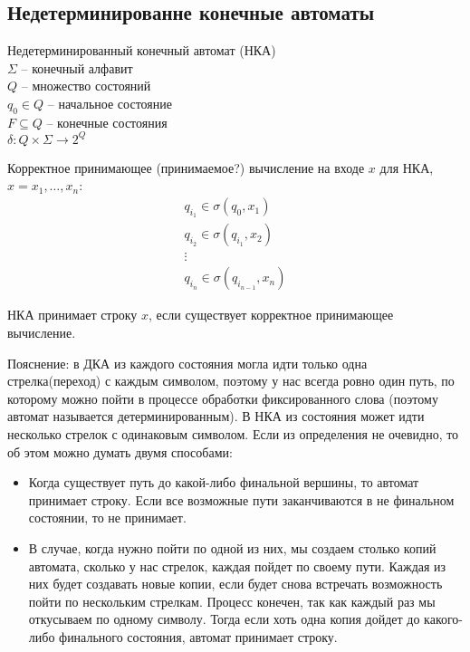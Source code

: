 \subsection{Недетерминированне конечные автоматы}

\begin{conj}
    Недетерминированный конечный автомат (НКА)\\
    $\Sigma$ -- конечный алфавит\\
    $Q$ -- множество состояний\\
    $q_0 \in Q$ -- начальное состояние\\
    $F \subseteq Q$ -- конечные состояния\\
    $\delta: Q \times \Sigma \to 2^Q$
\end{conj}
\begin{conj}
    Корректное принимающее (принимаемое?) вычисление на входе $x$ для НКА, $x = x_1, \dots, x_n$:
    \begin{gather*}
        q_{i_1} \in \sigma(q_0, x_1)\\
        q_{i_2} \in \sigma (q_{i_1}, x_2)\\
        \vdots\\
        q_{i_n} \in \sigma (q_{i_{n-1}}, x_n)
    \end{gather*}
\end{conj}

НКА принимает строку $x$, если существует корректное принимающее вычисление.

Пояснение: в ДКА из каждого состояния могла идти только одна стрелка(переход) с каждым символом, поэтому у нас всегда ровно один путь, по которому можно пойти в процессе обработки фиксированного слова (поэтому автомат называется детерминированным).
В НКА из состояния может идти несколько стрелок с одинаковым символом. Если из определения не очевидно, то об этом можно думать двумя способами:

\begin{itemize}
    \item Когда существует путь до какой-либо финальной вершины, то автомат принимает строку. Если все возможные пути заканчиваются в не финальном состоянии, то не принимает.
    \item В случае, когда нужно пойти по одной из них, мы создаем столько копий автомата, сколько у нас стрелок, каждая пойдет по своему пути. 
Каждая из них будет создавать новые копии, если будет снова встречать возможность пойти по нескольким стрелкам. Процесс конечен, так как каждый раз мы откусываем по одному символу. Тогда если хоть одна копия дойдет до какого-либо финального состояния, автомат принимает строку.
\end{itemize}

